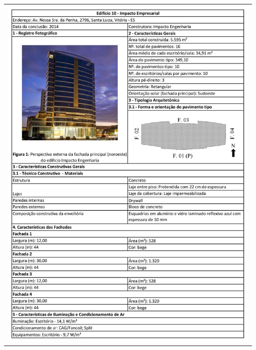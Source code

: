 \begin{table}[H]
    \centering
    \begin{tabular}{l}
        \includegraphics[width=\textwidth]{figures/appendices/edificio10.jpg}
    \end{tabular}
\end{table}
\vspace*{-0,5cm}
